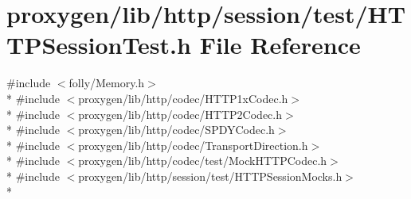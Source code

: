 \section{proxygen/lib/http/session/test/\+H\+T\+T\+P\+Session\+Test.h File Reference}
\label{HTTPSessionTest_8h}
{\ttfamily \#include $<$folly/\+Memory.\+h$>$}\\*
{\ttfamily \#include $<$proxygen/lib/http/codec/\+H\+T\+T\+P1x\+Codec.\+h$>$}\\*
{\ttfamily \#include $<$proxygen/lib/http/codec/\+H\+T\+T\+P2\+Codec.\+h$>$}\\*
{\ttfamily \#include $<$proxygen/lib/http/codec/\+S\+P\+D\+Y\+Codec.\+h$>$}\\*
{\ttfamily \#include $<$proxygen/lib/http/codec/\+Transport\+Direction.\+h$>$}\\*
{\ttfamily \#include $<$proxygen/lib/http/codec/test/\+Mock\+H\+T\+T\+P\+Codec.\+h$>$}\\*
{\ttfamily \#include $<$proxygen/lib/http/session/test/\+H\+T\+T\+P\+Session\+Mocks.\+h$>$}\\*
